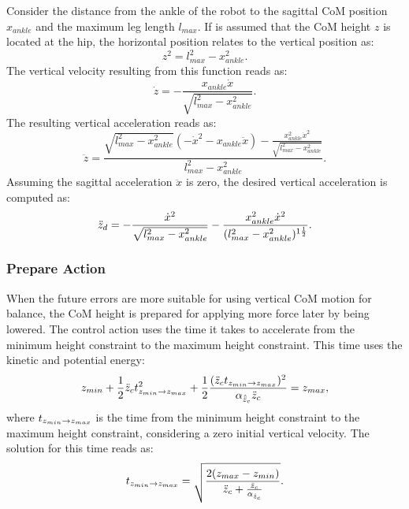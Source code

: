 Consider the distance from the ankle of the robot to the sagittal \ac{CoM} position $x_{ankle}$ and the maximum leg length $l_{max}$. If is assumed that the \ac{CoM} height $z$ is located at the hip, the horizontal position relates to the vertical position as:
\begin{equation}
z^2 = l_{max}^2-x_{ankle}^2.
\end{equation}
The vertical velocity resulting from this function reads as:
\begin{equation}
 \dot{z} = -\frac{x_{ankle}\dot{x}}{\sqrt{l_{max}^2-x_{ankle}^2}}.
\end{equation}
The resulting vertical acceleration reads as:
\begin{equation}
\ddot{z} = \frac{\sqrt{l_{max}^2-x_{ankle}^2}(-\dot{x}^2-x_{ankle}\ddot{x}) - \frac{x_{ankle}^2\dot{x}^2}{\sqrt{l_{max}^2-x_{ankle}^2}}}{ l_{max}^2-x_{ankle}^2}.
\end{equation}
Assuming the sagittal acceleration $\ddot{x}$ is zero, the desired vertical acceleration is computed as:
\begin{equation}
 \ddot{z}_d = -\frac{\dot{x}^2}{\sqrt{ l_{max}^2-x_{ankle}^2}} - \frac{x_{ankle}^2\dot{x}^2}{(l_{max}^2-x_{ankle}^2)^{1\frac{1}{2}}}.
\end{equation}
\subsubsection{Prepare Action} 
When the future errors are more suitable for using vertical \ac{CoM} motion for balance, the \ac{CoM} height is prepared for applying more force later by being lowered. The control action uses the time it takes to accelerate from the minimum height constraint to the maximum height constraint. This time uses the kinetic and potential energy:
\begin{equation}
	z_{min} + \frac{1}{2}\ddot{z}_{c} t_{z_{min} \rightarrow z_{max}}^2 + \frac{1}{2}\frac{(\ddot{z}_{c} t_{z_{min} \rightarrow z_{max}})^2}{\alpha_{\hat{\ddot{z}}_{c}} \ddot{z}_{c}} = z_{max},
\end{equation}
where $t_{z_{min} \rightarrow z_{max}}$ is the time from the minimum height constraint to the maximum height constraint, considering a zero initial vertical velocity.
The solution for this time reads as:
\begin{equation}
 t_{z_{min} \rightarrow z_{max}}= \sqrt{\frac{2(z_{max} - z_{min})}{\ddot{z}_{c} + \frac{\ddot{z}_{c}}{\alpha_{\hat{\ddot{z}}_{c}}} }}.
\end{equation}

